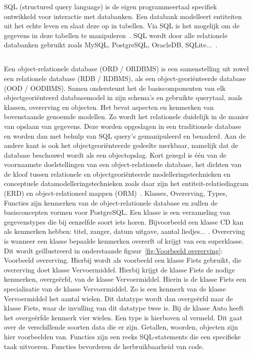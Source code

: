 SQL (structured query language) is de eigen programmeertaal specifiek ontwikkeld voor interactie met databanken. Een databank modelleert entiteiten uit het echte leven en slaat deze op in tabellen. Via SQL is het mogelijk om de gegevens in deze tabellen te manipuleren~\autocite{Carchedi2020}. SQL wordt door alle relationele databanken gebruikt zoals MySQL, PostgreSQL, OracleDB, SQLite...~\autocite{Codecademy}. 

\subsection{}
\label{subsec:Object-relationele databank}

Een object-relationele database (ORD / ORDBMS) is een samenstelling uit zowel een relationele database (RDB / RDBMS), als een object-georiënteerde database (OOD / OODBMS). Samen ondersteunt het de basiscomponenten van elk objectgeoriënteerd databasemodel in zijn schema's en gebruikte querytaal, zoals klassen, overerving en objecten. Het bevat aspecten en kenmerken van bovenstaande genoemde modellen. Zo wordt het relationele duidelijk in de manier van opslaan van gegevens. Deze worden opgeslagen in een traditionele database en worden dan met behulp van SQL query's gemanipuleerd en benaderd. Aan de andere kant is ook het objectgeoriënteerde gedeelte merkbaar, namelijk dat de database beschouwd wordt als een objectopslag. Kort gezegd is één van de voornaamste doelstellingen van een object-relationele database, het dichten van de kloof tussen relationele en objectgeoriënteerde modelleringstechnieken en conceptuele datamodelleringstechnieken zoals daar zijn het entiteit-relatiediagram (ERD) en object-relationeel mappen (ORM)~\autocite{Technopedia2021}. %
Klasses, Overerving, Types, Functies zijn kenmerken van de object-relationele database en zullen de basisconcepten vormen voor PostgreSQL. Een klasse is een verzameling van gegevenstypes die bij eenzelfde soort iets horen. Bijvoorbeeld een klasse CD kan als kenmerken hebben: titel, zanger, datum uitgave, aantal liedjes... . 
Overerving is wanneer een klasse bepaalde kenmerken overerft of krijgt van een superklasse. Dit wordt geïllustreerd in onderstaande figuur~\ref{fig:Voorbeeld overerving}: Voorbeeld overerving. Hierbij wordt als voorbeeld een klasse Fiets gebruikt, die overerving doet klasse Vervoermiddel. Hierbij krijgt de klasse Fiets de nodige kenmerken, overgeërfd, van de klasse Vervoermiddel. Hierin is de klasse Fiets een specialisatie van de klasse Vervoermiddel. Zo is een kenmerk van de klasse Vervoermiddel het aantal wielen. Dit datatype wordt dan overgeërfd naar de klasse Fiets, waar de invulling van dit datatype twee is. Bij de klasse Auto heeft het overgeërfde kenmerk vier wielen. Een type is hierboven al vermeld. Dit gaat over de verschillende soorten data die er zijn. Getallen, woorden, objecten zijn hier voorbeelden van. Functies zijn een reeks SQL-statements die een specifieke taak uitvoeren. Functies bevorderen de herbruikbaarheid van code.


